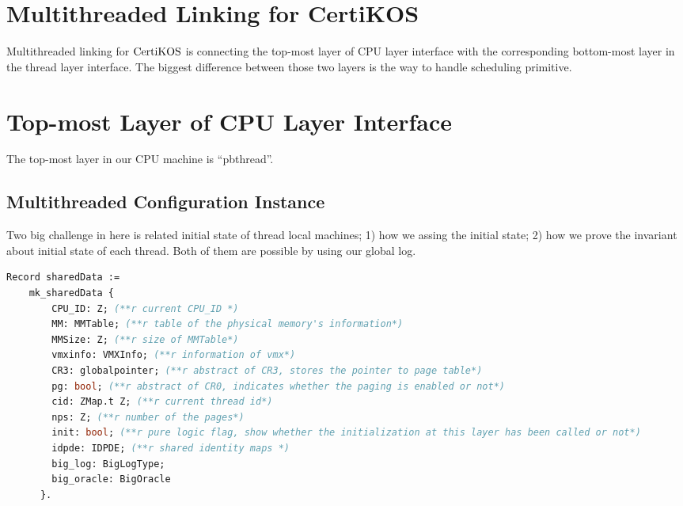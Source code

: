 \section{Multithreaded Linking for CertiKOS}
\label{chapter:certikos:sec:multithreaded-linking-for-certikos}

Multithreaded linking for $\mathrm{CertiKOS}$ is connecting the top-most layer of CPU layer
 interface with
the corresponding bottom-most layer in the thread layer interface. 
The biggest difference between those two layers is 
the way to handle scheduling primitive. 



\section{Top-most Layer of CPU Layer Interface}
\label{chapter:certikos:subsec:pbthread}

The top-most layer in our CPU machine is ``pbthread''.





\subsection{Multithreaded Configuration Instance}
\label{chapter:certikos:subsec:multithreaded-configuration-instance}

Two big challenge in here is related initial state of thread local machines; 
1) how we assing the initial state; 2) how we prove the invariant about initial state 
of each thread. 
Both of them are possible by using our global log. 

\begin{lstlisting}[language=Caml]
  Record sharedData :=
    mk_sharedData {
        CPU_ID: Z; (**r current CPU_ID *)
        MM: MMTable; (**r table of the physical memory's information*)
        MMSize: Z; (**r size of MMTable*)
        vmxinfo: VMXInfo; (**r information of vmx*)
        CR3: globalpointer; (**r abstract of CR3, stores the pointer to page table*)
        pg: bool; (**r abstract of CR0, indicates whether the paging is enabled or not*)
        cid: ZMap.t Z; (**r current thread id*)
        nps: Z; (**r number of the pages*)
        init: bool; (**r pure logic flag, show whether the initialization at this layer has been called or not*)
        idpde: IDPDE; (**r shared identity maps *)
        big_log: BigLogType;
        big_oracle: BigOracle
      }.
\end{lstlisting}

